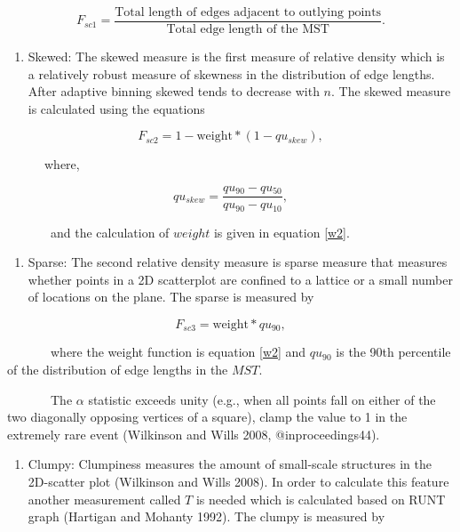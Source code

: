 \documentclass{article}
\begin{document}
\begin{equation}
      F_{sc1} = \frac{\text{Total length of edges adjacent to outlying points}}{\text{Total edge length of the MST}}.
\end{equation}

\begin{enumerate}
\def\labelenumi{\roman{enumi})}
\setcounter{enumi}{1}
\tightlist
\item
  Skewed: The skewed measure is the first measure of relative density
  which is a relatively robust measure of skewness in the distribution
  of edge lengths. After adaptive binning skewed tends to decrease with
  \(n\). The skewed measure is calculated using the equations
\end{enumerate}

\begin{equation}
    F_{sc2} = 1-\text{weight}*(1-qu_{skew}), 
\end{equation}

~~~~~~where,

\begin{equation}
    qu_{skew} = \frac{qu_{90}-qu_{50}}{qu_{90}-qu_{10}}, 
\end{equation}

~~~~~~~and the calculation of \(weight\) is given in equation \ref{w2}.

\begin{enumerate}
\def\labelenumi{\roman{enumi})}
\setcounter{enumi}{2}
\tightlist
\item
  Sparse: The second relative density measure is sparse measure that
  measures whether points in a 2D scatterplot are confined to a lattice
  or a small number of locations on the plane. The sparse is measured by
\end{enumerate}

\begin{equation}
   F_{sc3} = \text{weight} *qu_{90},
\end{equation}

~~~~~~~where the weight function is equation \ref{w2} and \(qu_{90}\) is
the 90th percentile of the distribution of edge lengths in the \(MST\).

~~~~~~~The \(\alpha\) statistic exceeds unity (e.g., when all points
fall on either of the two diagonally opposing vertices of a square),
clamp the value to 1 in the extremely rare event (Wilkinson and Wills
2008, @inproceedings44).

\begin{enumerate}
\def\labelenumi{\roman{enumi})}
\setcounter{enumi}{3}
\tightlist
\item
  Clumpy: Clumpiness measures the amount of small-scale structures in
  the 2D-scatter plot (Wilkinson and Wills 2008). In order to calculate
  this feature another measurement called \(T\) is needed which is
  calculated based on RUNT graph (Hartigan and Mohanty 1992). The clumpy
  is measured by
\end{enumerate}
\end{document}
